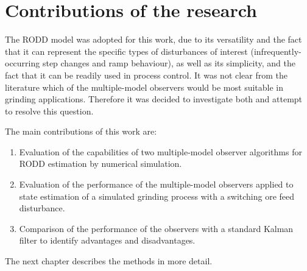 
\section{Contributions of the research} \label{sec:contributions}

The \gls{RODD} model was adopted for this work, due to its versatility and the fact that it can represent the specific types of disturbances of interest (infrequently-occurring step changes and ramp behaviour), as well as its simplicity, and the fact that it can be readily used in process control. It was not clear from the literature which of the multiple-model observers would be most suitable in grinding applications. Therefore it was decided to investigate both and attempt to resolve this question.

The main contributions of this work are:
\begin{enumerate}
	\item Evaluation of the capabilities of two multiple-model observer algorithms for \gls{RODD} estimation by numerical simulation.
	\item Evaluation of the performance of the multiple-model observers applied to state estimation of a simulated grinding process with a switching ore feed disturbance.
	\item Comparison of the performance of the observers with a standard Kalman filter to identify advantages and disadvantages.
\end{enumerate}

The next chapter describes the methods in more detail.



